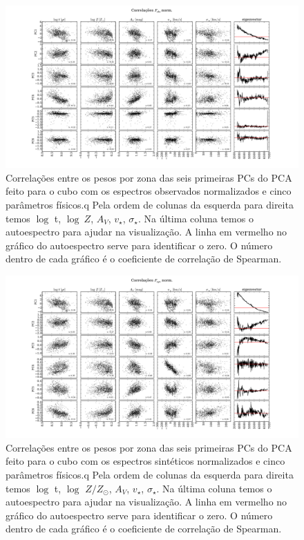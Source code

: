 \begin{figure}
    \includegraphics[width=1.3\textwidth, angle=-90]{figuras/K0008-correl-f_obs_norm-PCvsPhys.pdf}
	\caption[Correlações PCs vs. par\^ametros f\'isicos - $F_{obs}$ norm. - NGC 0001]
    {Correlações entre os pesos por zona das seis primeiras PCs do PCA feito para o cubo com os espectros observados
    normalizados e cinco parâmetros físicos.q Pela ordem de colunas da esquerda para direita temos $\log$ t, $\log\ Z$,
    $A_V$, $v_{\star}$, $\sigma_{\star}$. Na última coluna temos o autoespectro para ajudar na visualização. A linha em
    vermelho no gráfico do autoespectro serve para identificar o zero. O número dentro de cada gráfico é o coeficiente
    de correlação de Spearman.}
    \label{fig:K0008correfobsnorm}
\end{figure}

\begin{figure}
    \includegraphics[width=1.3\textwidth, angle=-90]{figuras/K0008-correl-f_syn_norm-PCvsPhys.pdf}
	\caption[Correlações PCs vs. par\^ametros f\'isicos - $F_{syn}$ norm. - NGC 0001]
    {Correlações entre os pesos por zona das seis primeiras PCs do PCA feito para o cubo com os espectros sintéticos
    normalizados e cinco parâmetros físicos.q Pela ordem de colunas da esquerda para direita temos $\log$ t, $\log$ $Z /
    Z_{\odot}$, $A_V$, $v_{\star}$, $\sigma_{\star}$. Na última coluna temos o autoespectro para ajudar na visualização.
    A linha em vermelho no gráfico do autoespectro serve para identificar o zero. O número dentro de cada gráfico é o
    coeficiente de correlação de Spearman.}
    \label{fig:K0008correfsynnorm}
\end{figure}

